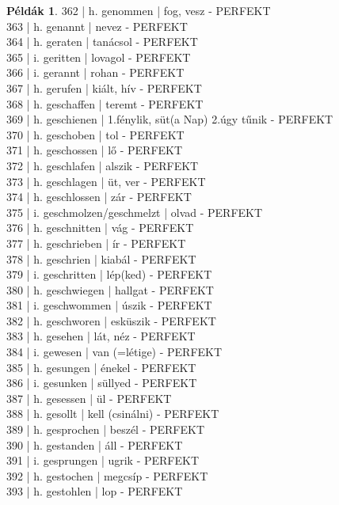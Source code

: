 \documentclass{article}
\theoremstyle{definition}
\newtheorem*{exmp}{Példák}
\begin{document}
\begin{exmp}
362 | h. genommen | fog, vesz - PERFEKT\\
363 | h. genannt | nevez - PERFEKT\\
364 | h. geraten | tanácsol - PERFEKT\\
365 | i. geritten | lovagol - PERFEKT\\
366 | i. gerannt | rohan - PERFEKT\\
367 | h. gerufen | kiált, hív - PERFEKT\\
368 | h. geschaffen | teremt - PERFEKT\\
369 | h. geschienen | 1.fénylik, süt(a Nap) 2.úgy tűnik - PERFEKT\\
370 | h. geschoben | tol - PERFEKT\\
371 | h. geschossen | lő - PERFEKT\\
372 | h. geschlafen | alszik - PERFEKT\\
373 | h. geschlagen | üt, ver - PERFEKT\\
374 | h. geschlossen | zár - PERFEKT\\
375 | i. geschmolzen/geschmelzt | olvad - PERFEKT\\
376 | h. geschnitten | vág - PERFEKT\\
377 | h. geschrieben | ír - PERFEKT\\
378 | h. geschrien | kiabál - PERFEKT\\
379 | i. geschritten | lép(ked) - PERFEKT\\
380 | h. geschwiegen | hallgat - PERFEKT\\
381 | i. geschwommen | úszik - PERFEKT\\
382 | h. geschworen | esküszik - PERFEKT\\
383 | h. gesehen | lát, néz - PERFEKT\\
384 | i. gewesen | van (=létige) - PERFEKT\\
385 | h. gesungen | énekel - PERFEKT\\
386 | i. gesunken | süllyed - PERFEKT\\
387 | h. gesessen | ül - PERFEKT\\
388 | h. gesollt | kell (csinálni) - PERFEKT\\
389 | h. gesprochen | beszél - PERFEKT\\
390 | h. gestanden | áll - PERFEKT\\
391 | i. gesprungen | ugrik - PERFEKT\\
392 | h. gestochen | megcsíp - PERFEKT\\
393 | h. gestohlen | lop - PERFEKT\\

\end{exmp}
\end{document}
